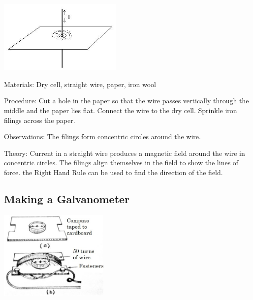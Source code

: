 \begin{multicols}{2}
\begin{center}
\includegraphics[width=0.45\textwidth]{./img/induced-mag-field-wire.png}
\end{center}

\begin{description*}
\item[Materials:]{Dry cell, straight wire, paper, iron wool}
\item[Procedure:]{Cut a hole in the paper so that the wire passes vertically through the middle and the paper lies flat. Connect the wire to the dry cell. Sprinkle iron filings across the paper.}
\item[Observations:]{The filings form concentric circles around the wire.}
\item[Theory:]{Current in a straight wire produces a magnetic field around the wire in concentric circles. The filings align themselves in the field to show the lines of force. the Right Hand Rule can be used to find the direction of the field.}
\end{description*}

\subsection{Making a Galvanometer} 

\begin{center}
\includegraphics[width=0.4\textwidth]{./img/galvanometer.jpg}
\end{center}


\end{multicols}
